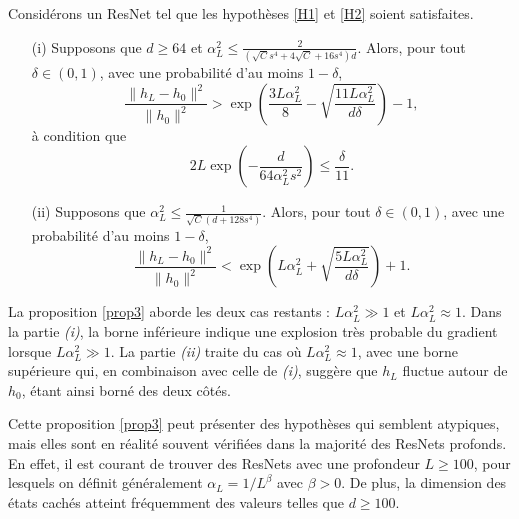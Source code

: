 \begin{proposition}[Admise]\label{prop3}
    Considérons un ResNet \cite{torchvision2016} tel que les hypothèses \ref{H1} et \ref{H2} soient satisfaites.
    \begin{itemize}
        \item[(i)] Supposons que $ d \geq 64 $ et $ \alpha _L ^2 \leq  \frac{2 }{(\sqrt{C } s^4 + 4 \sqrt{C } + 16 s ^4)d} $. Alors, pour tout $ \delta \in (0, 1) $, avec une probabilité d'au moins $ 1 - \delta $,
        \[
            \frac{\|h_L - h_0\|^2}{\|h_0\|^2} > \exp\left(\frac{3L\alpha_L^2}{8} - \sqrt{\frac{11L\alpha_L^2}{d\delta}}\right) - 1,
        \]
        à condition que
        \[
            2L \exp\left(-\frac{d}{64\alpha_L^2s^2}\right) \leq \frac{\delta}{11}.
        \]
        \item[(ii)] Supposons que $ \alpha_L^2 \leq \frac{1}{\sqrt{C}(d + 128s^4)} $. Alors, pour tout $ \delta \in (0, 1)$, avec une probabilité d'au moins $1 - \delta $,
        \[
            \frac{\|h_L - h_0\|^2}{\|h_0\|^2} < \exp\left(L\alpha_L^2 + \sqrt{\frac{5L\alpha_L^2}{d\delta}}\right) + 1.
        \]
    \end{itemize}
\end{proposition}
La proposition \ref{prop3} aborde les deux cas restants : $L \alpha_L^2 \gg 1$ et $L \alpha_L^2 \approx 1$. Dans la partie \textit{(i)}, la borne inférieure indique une explosion très probable du gradient lorsque $L \alpha_L^2 \gg 1$. La partie \textit{(ii)} traite du cas où $L \alpha_L^2 \approx 1$, avec une borne supérieure qui, en combinaison avec celle de \textit{(i)}, suggère que $h_L$ fluctue autour de $h_0$, étant ainsi borné des deux côtés.

Cette proposition \ref{prop3} peut présenter des hypothèses qui semblent atypiques, mais elles sont en réalité souvent vérifiées dans la majorité des ResNets profonds. En effet, il est courant de trouver des ResNets avec une profondeur $L \geq 100$, pour lesquels on définit généralement $\alpha_L = 1 / L^\beta$ avec $\beta > 0$. De plus, la dimension des états cachés atteint fréquemment des valeurs telles que $d \geq 100$.

